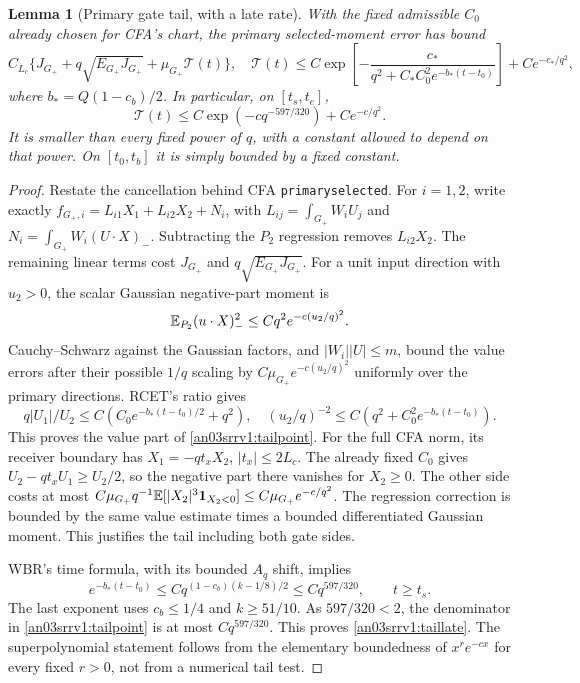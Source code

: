 \documentclass[11pt]{article}
\numberwithin{equation}{section}
\newtheorem{lemma}[theorem]{Lemma}\newtheorem{proposition}[theorem]{Proposition}
\theoremstyle{remark}\newtheorem{remark}[theorem]{Remark}
\newcommand{\Gp}{{G_+}}\newcommand{\eps}{\varepsilon}
\newcommand{\one}{\mathbf1}\newcommand{\ph}{\phi(0)}
\begin{document}
\begin{lemma}[Primary gate tail, with a late rate]
\label{an03srrv1:tail}
With the fixed admissible $C_0$ already chosen for CFA's chart,
the primary selected-moment error has bound
\begin{equation}
 C_{L_c}\{J_\Gp+q\sqrt{E_\Gp J_\Gp}+\mu_\Gp\mathcal T(t)\},
 \quad
 \mathcal T(t)\le C\exp\left[-\frac{c_*}
 {q^2+C_*C_0^2e^{-b_*(t-t_0)}}\right]+Ce^{-c_*/q^2},
 \label{an03srrv1:tailpoint}
\end{equation}
where $b_*=Q(1-c_b)/2$. In particular, on $[t_s,t_e]$,
\begin{equation}
 \mathcal T(t)\le C\exp(-c q^{-597/320})+Ce^{-c/q^2}.
 \label{an03srrv1:taillate}
\end{equation}
It is smaller than every fixed power of $q$, with a constant
allowed to depend on that power. On $[t_0,t_b]$ it is simply
bounded by a fixed constant.
\end{lemma}
\begin{proof}
Restate the cancellation behind CFA \texttt{primaryselected}.
For $i=1,2$, write exactly
$f_{\Gp,i}=L_{i1}X_1+L_{i2}X_2+N_i$, with
$L_{ij}=\int_\Gp W_iU_j$ and
$N_i=\int_\Gp W_i(U\cdot X)_-$.
Subtracting the $P_2$ regression removes $L_{i2}X_2$.
The remaining linear terms cost $J_\Gp$ and
$q\sqrt{E_\Gp J_\Gp}$. For a unit input direction with
$u_2>0$, the scalar Gaussian negative-part moment is
\[
 \mathbb E_{P_2}(u\cdot X)_-^2
 \le Cq^2 e^{-c(u_2/q)^2}.
\]
Cauchy--Schwarz against the Gaussian factors, and
$|W_i||U|\le m$, bound the value errors after their possible
$1/q$ scaling by $C\mu_\Gp e^{-c(u_2/q)^2}$ uniformly over
the primary directions. RCET's ratio gives
\[
 q|U_1|/U_2\le C(C_0e^{-b_*(t-t_0)/2}+q^2),\quad
 (u_2/q)^{-2}\le C(q^2+C_0^2e^{-b_*(t-t_0)}).
\]
This proves the value part of \eqref{an03srrv1:tailpoint}.
For the full CFA norm, its receiver boundary has
$X_1=-qt_xX_2$, $|t_x|\le2L_c$.
The already fixed $C_0$ gives $U_2-qt_xU_1\ge U_2/2$,
so the negative part there vanishes for $X_2\ge0$.
The other side costs at most
$C\mu_\Gp q^{-1}\E[|X_2|^3\one_{X_2<0}]\le
C\mu_\Gp e^{-c/q^2}$. The regression correction is bounded
by the same value estimate times a bounded differentiated
Gaussian moment. This justifies the tail including both gate sides.

WBR's time formula, with its bounded $A_q$ shift, implies
\[
 e^{-b_*(t-t_0)}\le Cq^{(1-c_b)(k-1/8)/2}
                  \le Cq^{597/320},\qquad t\ge t_s.
\]
The last exponent uses $c_b\le1/4$ and $k\ge51/10$.
As $597/320<2$, the denominator in \eqref{an03srrv1:tailpoint}
is at most $Cq^{597/320}$. This proves \eqref{an03srrv1:taillate}.
The superpolynomial statement follows from the elementary boundedness
of $x^re^{-cx}$ for every fixed $r>0$, not from a numerical tail test.
\end{proof}
\end{document}
